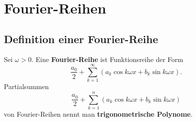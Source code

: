 
\chapter{Fourier-Reihen}

\section{Definition einer Fourier-Reihe}

\begin{defn}
	Sei $\omega> 0$. Eine \textbf{Fourier-Reihe}
	 ist Funktionsreihe der Form 
	\[
		\frac{a_0}{2} + \sum_{k=1}^\infty ( a_k \cos k \omega x + b_k \sin k \omega x). 
	\]
	Partialsummen 
	\[
		\frac{a_0}{2} + \sum_{k=1}^n (a_k \cos k \omega x + b_k \sin k \omega x)
	\]
	von Fourier-Reihen nennt man \textbf{trigonometrische Polynome}. 
\end{defn}

